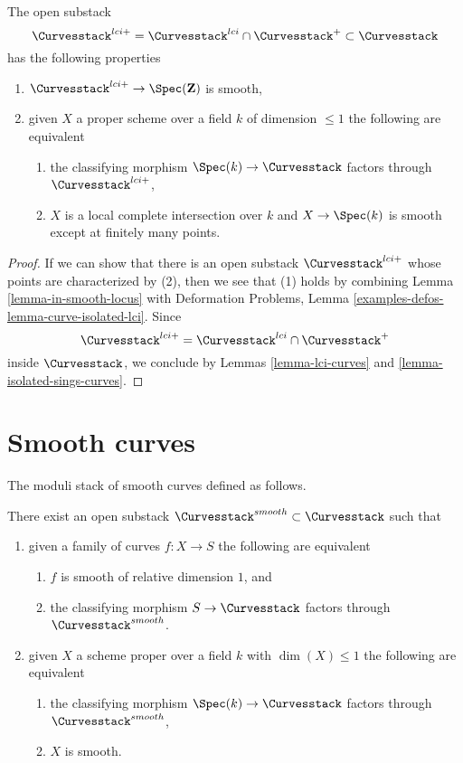 \begin{lemma}
\label{lemma-big-smooth-part-curves}
The open substack
$$
\Curvesstack^{lci+} =
\Curvesstack^{lci} \cap \Curvesstack^{+}
\subset \Curvesstack
$$
has the following properties
\begin{enumerate}
\item $\Curvesstack^{lci+} \to \Spec(\mathbf{Z})$ is smooth,
\item given $X$ a proper scheme over a field $k$ of dimension $\leq 1$
the following are equivalent
\begin{enumerate}
\item the classifying morphism $\Spec(k) \to \Curvesstack$ factors
through $\Curvesstack^{lci+}$,
\item $X$ is a local complete intersection over $k$ and
$X \to \Spec(k)$ is smooth except at finitely many points.
\end{enumerate}
\end{enumerate}
\end{lemma}

\begin{proof}
If we can show that there is an open substack $\Curvesstack^{lci+}$
whose points are characterized by (2), then we see that
(1) holds by combining Lemma \ref{lemma-in-smooth-locus} with
Deformation Problems, Lemma \ref{examples-defos-lemma-curve-isolated-lci}.
Since
$$
\Curvesstack^{lci+} = \Curvesstack^{lci} \cap \Curvesstack^{+}
$$
inside $\Curvesstack$, we conclude by
Lemmas \ref{lemma-lci-curves} and \ref{lemma-isolated-sings-curves}.
\end{proof}




\section{Smooth curves}
\label{section-smooth-curves}

\noindent
The moduli stack of smooth curves defined as follows.

\begin{lemma}
\label{lemma-smooth-curves}
There exist an open substack $\Curvesstack^{smooth} \subset \Curvesstack$
such that
\begin{enumerate}
\item given a family of curves $f : X \to S$ the following are equivalent
\begin{enumerate}
\item $f$ is smooth of relative dimension $1$, and
\item the classifying morphism $S \to \Curvesstack$ factors
through $\Curvesstack^{smooth}$.
\end{enumerate}
\item given $X$ a scheme proper over a field $k$ with
$\dim(X) \leq 1$ the following are equivalent
\begin{enumerate}
\item the classifying morphism $\Spec(k) \to \Curvesstack$
factors through $\Curvesstack^{smooth}$,
\item $X$ is smooth.
\end{enumerate}
\end{enumerate}
\end{lemma}

